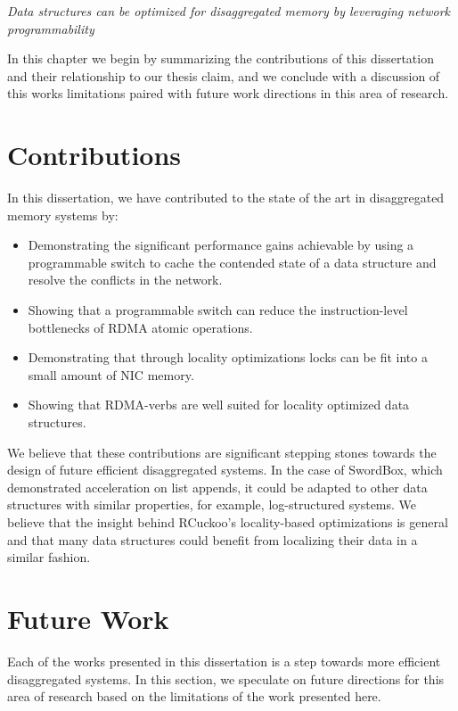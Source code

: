 \documentclass[12pt]{ucsddissertation}
\newcommand{\sword}{SwordBox}
\begin{document}
\begin{center}
\textit{Data structures can be optimized for disaggregated memory by leveraging network programmability} \\
\end{center}


In this chapter we begin by summarizing the contributions of this dissertation and their
relationship to our thesis claim, and we conclude with a discussion of this works limitations paired
with future work directions in this area of research.

\section{Contributions}

In this dissertation, we have contributed to the state of the art in disaggregated memory systems by:

\begin{itemize}
    \item Demonstrating the significant performance gains achievable by using a programmable switch to cache the contended state of a data structure and resolve the conflicts in the network.
    \item Showing that a programmable switch can reduce the instruction-level bottlenecks of RDMA atomic operations.
    \item Demonstrating that through locality optimizations locks can be fit into a small amount of NIC memory.
    \item Showing that RDMA-verbs are well suited for locality optimized data structures.
\end{itemize}

We believe that these contributions are significant stepping stones towards the design of future
efficient disaggregated systems. In the case of {\sword}, which demonstrated acceleration on
list appends, it could be adapted to other data structures with similar properties, for example,
log-structured systems. We believe that the insight behind RCuckoo's locality-based optimizations is
general and that many data structures could benefit from localizing their data in a similar fashion.

\section{Future Work}


Each of the works presented in this dissertation is a step towards more efficient disaggregated
systems. In this section, we speculate on future directions for this area of research based on the
limitations of the work presented here.
\end{document}
